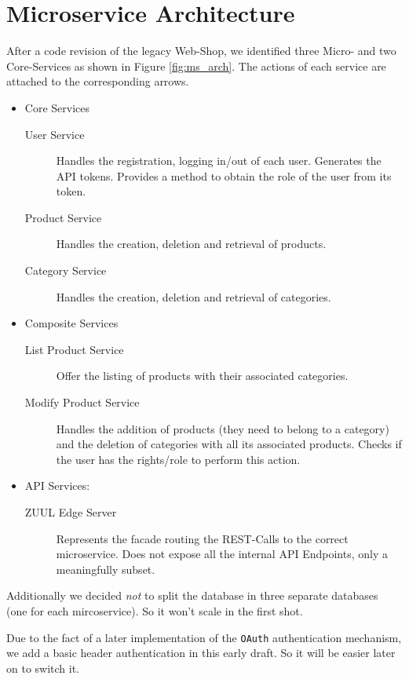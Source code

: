 \documentclass[11pt]{article}
\begin{document}
	
	\section{Microservice Architecture}
	 After a code revision of the legacy Web-Shop, we identified three Micro- and two Core-Services as shown in Figure \ref{fig:ms_arch}. 
	The actions of each service are attached to the corresponding arrows.
	\begin{itemize}
		\item Core Services
		\begin{description}
			\item[User Service] Handles the registration, logging in/out of each user. Generates the API tokens. Provides a method to obtain the role of the user from its token.
			\item[Product Service] Handles the creation, deletion and retrieval of products.
			\item[Category Service] Handles the creation, deletion and retrieval of categories.
		\end{description}
		\item Composite Services
		\begin{description}
			\item[List Product Service] Offer the listing of products with their associated categories.
			\item[Modify Product Service] Handles the addition of products (they need to belong to a category) and the deletion of categories with all its associated products. Checks if the user has the rights/role to perform this action.
		\end{description}
		\item API Services:
		\begin{description}
			\item[ZUUL Edge Server] Represents the facade routing the REST-Calls to the correct microservice. Does not expose all the internal API Endpoints, only a meaningfully subset.
		\end{description}
	\end{itemize}
	
	 Additionally we decided \textit{not} to split the database in three separate databases (one for each mircoservice). So it won't scale in the first shot. 
	
	Due to the fact of a later implementation of the \texttt{OAuth} authentication mechanism, we add a basic header authentication in this early draft. So it will be easier later on to switch it.
	
\end{document}
